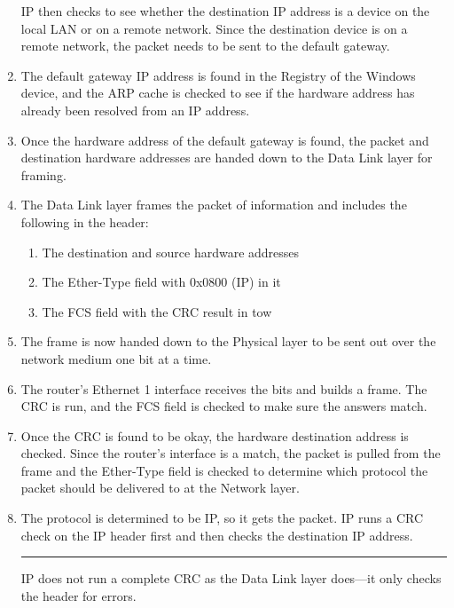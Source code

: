 \begin{enumerate}
  IP then checks to see whether the destination IP address is a device
  on the local LAN or on a remote network. Since the destination device
  is on a remote network, the packet needs to be sent to the default
  gateway.
\item
  \protect\hypertarget{c09.xhtmlux5cux23Page_365}{}{}The default gateway
  IP address is found in the Registry of the Windows device, and the ARP
  cache is checked to see if the hardware address has already been
  resolved from an IP address.
\item
  Once the hardware address of the default gateway is found, the packet
  and destination hardware addresses are handed down to the Data Link
  layer for framing.
\item
  The Data Link layer frames the packet of information and includes the
  following in the header:

  \begin{enumerate}
  \tightlist
  \item
    The destination and source hardware addresses
  \item
    The Ether-Type field with 0x0800 (IP) in it
  \item
    The FCS field with the CRC result in tow
  \end{enumerate}
\item
  The frame is now handed down to the Physical layer to be sent out over
  the network medium one bit at a time.
\item
  The router's Ethernet 1 interface receives the bits and builds a
  frame. The CRC is run, and the FCS field is checked to make sure the
  answers match.
\item
  Once the CRC is found to be okay, the hardware destination address is
  checked. Since the router's interface is a match, the packet is pulled
  from the frame and the Ether-Type field is checked to determine which
  protocol the packet should be delivered to at the Network layer.
\item
  The protocol is determined to be IP, so it gets the packet. IP runs a
  CRC check on the IP header first and then checks the destination IP
  address.

  \begin{center}\rule{0.5\linewidth}{0.5pt}\end{center}

  IP does not run a complete CRC as
  the Data Link layer does---it only checks the header for errors.


\end{enumerate}
